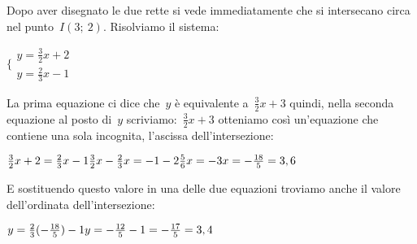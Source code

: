    Dopo aver disegnato le due rette si vede immediatamente che si intersecano 
   circa nel punto~$I(3;~2)$. Risolviamo il sistema:
   
   $\bigg \{
     \begin{array}{l}
      y = \frac{3}{2} x +2 \\
      y = \frac{2}{3} x -1
     \end{array}
   $
  
   La prima equazione ci dice che~$y$ è equivalente a~$\frac{3}{2} x + 3$ 
   quindi, nella seconda equazione al posto di~$y$ 
   scriviamo:~$\frac{3}{2} x + 3$ otteniamo così un'equazione che contiene 
   una sola incognita, l'ascissa dell'intersezione:
   
   $\frac{3}{2} x +2 = \frac{2}{3} x -1 \newline
    \frac{3}{2} x - \frac{2}{3} x = -1 -2 \newline
    \frac{5}{6} x = -3 \newline
    x = -\frac{18}{5} = 3,6$
   
   E sostituendo questo valore in una delle due equazioni troviamo anche il 
   valore dell'ordinata dell'intersezione:
   
   $y = \frac{2}{3} (-\frac{18}{5}) -1 \newline
    y = - \frac{12}{5} -1 = - \frac{17}{5} = 3,4$


